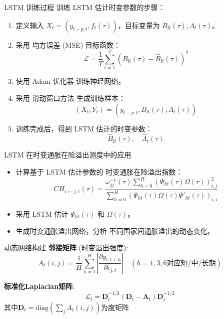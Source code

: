 \documentclass{beamer}
\begin{document}
\begin{frame}{LSTM 训练过程}
  训练 LSTM 估计时变参数的步骤：
  \begin{enumerate}
      \item 定义输入 \( X_t = (y_{t-p:t}, f_t(\tau)) \)，目标变量为 \( B_{lt}(\tau), \Lambda_t(\tau) \)。
      \item 采用 均方误差 (MSE) 目标函数：
      \begin{equation}
          \mathcal{L} = \frac{1}{T} \sum_{t=1}^{T} \left( B_{lt}(\tau) - \hat{B}_{lt}(\tau) \right)^2
      \end{equation}
      \item 使用 Adam 优化器 训练神经网络。
      \item 采用 滑动窗口方法 生成训练样本：
      \begin{equation}
          (X_t, Y_t) = (y_{t-p:t}, B_{lt}(\tau), \Lambda_t(\tau))
      \end{equation}
      \item 训练完成后，得到 LSTM 估计的时变参数：
      \begin{equation}
          \hat{B}_{lt}(\tau), \quad \hat{\Lambda}_t(\tau)
      \end{equation}
  \end{enumerate}
\end{frame}

\begin{frame}{LSTM 在时变通胀在险溢出测度中的应用}
  \begin{itemize}
      \item 计算基于 LSTM 估计参数的 时变通胀在险溢出指数：
      \begin{equation}
          CH_{i \leftarrow j, t}(\tau) = \frac{\omega_{jj}^{-1}(\tau) \sum_{h=0}^{H} \left( \Psi_{ht}(\tau) \Omega(\tau) \right)_{i,j}^2 }{\sum_{h=0}^{H} \left( \Psi_{ht}(\tau) \Omega(\tau) \Psi'_{ht}(\tau) \right)_{i,i}}
      \end{equation}
      \item 采用 LSTM 估计 \( \Psi_{ht}(\tau) \) 和 \( \Omega(\tau) \)。
      \item 生成时变通胀溢出网络，分析 不同国家间通胀溢出的动态变化。
  \end{itemize}
\end{frame}
\begin{frame}{动态网络构建}
\textbf{邻接矩阵} (时变溢出强度):
\begin{equation*}
A_t(i,j) = \frac{1}{H}\sum_{h=1}^H \left| \frac{\partial y_{i,t+h}}{\partial \epsilon_{j,t}} \right| \quad (h=1,3,6 \text{对应短/中/长期})
\end{equation*}

\textbf{标准化Laplacian矩阵}:
\begin{equation*}
\mathcal{L}_t = \boldsymbol{D}_t^{-1/2} (\boldsymbol{D}_t - \boldsymbol{A}_t) \boldsymbol{D}_t^{-1/2}
\end{equation*}
其中$\boldsymbol{D}_t = \text{diag}(\sum_j A_t(i,j))$为度矩阵
\end{frame}
\end{document}
